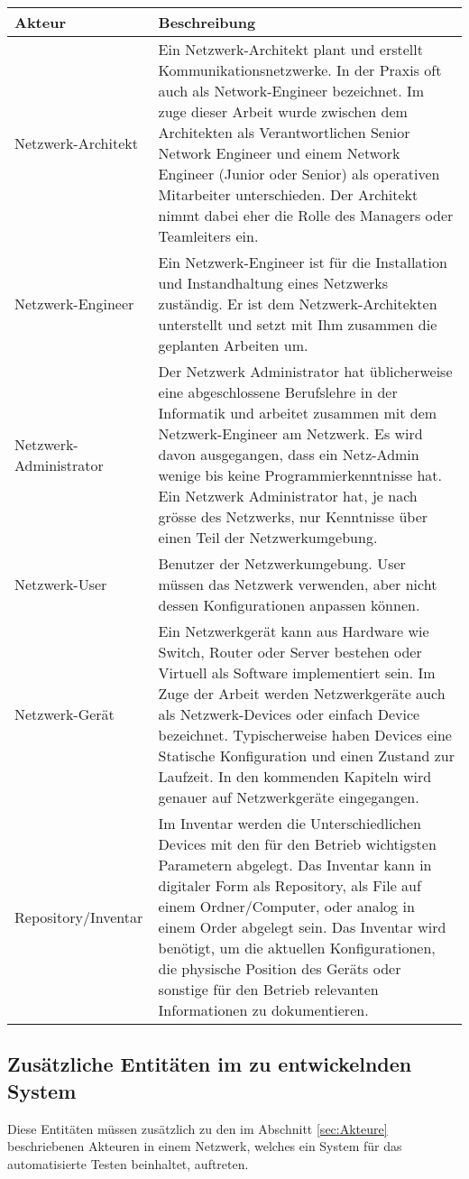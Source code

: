 \documentclass[
	ngerman,
	toc=listof, %
	toc=bibliography, %
	footnotes=multiple, %
	parskip=half, %
	numbers=noendperiod %
]{scrartcl}
\begin{document}
	\begin{tabularx}{\textwidth}{lX}
			\toprule
			Akteur &  Beschreibung \\
			\midrule
			Netzwerk-Architekt  & Ein Netzwerk-Architekt plant und erstellt Kommunikationsnetzwerke. In der Praxis oft auch als Network-Engineer bezeichnet. Im zuge dieser Arbeit wurde zwischen dem Architekten als Verantwortlichen Senior Network Engineer und einem Network Engineer (Junior oder Senior) als operativen Mitarbeiter unterschieden. Der Architekt nimmt dabei eher die Rolle des Managers oder Teamleiters ein. \\ 
			Netzwerk-Engineer  & Ein Netzwerk-Engineer ist für die Installation und Instandhaltung eines Netzwerks zuständig. Er ist dem Netzwerk-Architekten unterstellt und setzt mit Ihm zusammen die geplanten Arbeiten um. \\
			Netzwerk-Administrator  & Der Netzwerk Administrator hat üblicherweise eine abgeschlossene Berufslehre in der Informatik und arbeitet zusammen mit dem Netzwerk-Engineer am Netzwerk. Es wird davon ausgegangen, dass ein Netz-Admin wenige bis keine Programmierkenntnisse hat. Ein Netzwerk Administrator hat, je nach grösse des Netzwerks, nur Kenntnisse über einen Teil der Netzwerkumgebung. \\
			Netzwerk-User & Benutzer der Netzwerkumgebung. User müssen das Netzwerk verwenden, aber nicht dessen Konfigurationen anpassen können. \\
			\midrule
			Netzwerk-Gerät  & Ein Netzwerkgerät kann aus Hardware wie Switch, Router oder Server bestehen oder Virtuell als Software implementiert sein. Im Zuge der Arbeit werden Netzwerkgeräte auch als Netzwerk-Devices oder einfach Device bezeichnet. Typischerweise haben Devices eine Statische Konfiguration und einen Zustand zur Laufzeit. In den kommenden Kapiteln wird genauer auf Netzwerkgeräte eingegangen. \\
			Repository/Inventar &  Im Inventar werden die Unterschiedlichen Devices mit den für den Betrieb wichtigsten Parametern abgelegt. Das Inventar kann in digitaler Form als Repository, als File auf einem Ordner/Computer, oder analog in einem Order abgelegt sein. Das Inventar wird benötigt, um die aktuellen Konfigurationen, die physische Position des Geräts oder sonstige für den Betrieb relevanten Informationen zu dokumentieren. \\
			\bottomrule
		\end{tabularx}
		\newpage

	\subsection{Zusätzliche Entitäten im zu entwickelnden System}
	Diese Entitäten müssen zusätzlich zu den im Abschnitt \ref{sec:Akteure} beschriebenen Akteuren in einem Netzwerk, welches ein System für das automatisierte Testen beinhaltet, auftreten.
	
\end{document}
